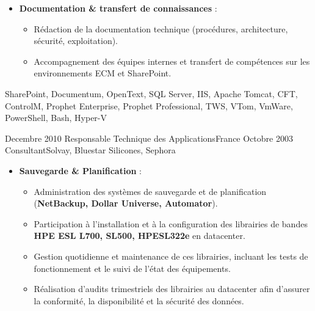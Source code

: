 \begin{experiences}
{\begin{itemize}[left=0pt,label={},itemsep=0.4em]
          \item \textbf{Documentation \& transfert de connaissances} :
            \begin{itemize}[itemsep=0.15em,topsep=0.1em,parsep=0pt]
              \small
              \item Rédaction de la documentation technique (procédures, architecture, sécurité, exploitation).
              \item Accompagnement des équipes internes et transfert de compétences sur les environnements ECM et SharePoint.
            \end{itemize}

        \end{itemize}
    }
    {SharePoint, Documentum, OpenText, SQL Server, IIS, Apache Tomcat, CFT, ControlM, Prophet Enterprise, Prophet Professional, TWS, VTom, VmWare, PowerShell, Bash, Hyper-V}
\emptySeparator


\consultantexperience
    {Decembre 2010} {Responsable Technique des Applications}{}{France}
    {Octobre 2003}    {Consultant}{Solvay, Bluestar Silicones, Sephora} {
        \begin{itemize}[left=0pt,label={},itemsep=0.5em]

          \item \textbf{Sauvegarde \& Planification} :
            \begin{itemize}[itemsep=0.2em,topsep=0.2em,parsep=0pt]
              \small
              \item Administration des systèmes de sauvegarde et de planification (\textbf{NetBackup, Dollar Universe, Automator}).
              \item Participation à l'installation et à la configuration des librairies de bandes \textbf{HPE ESL L700, SL500, HPESL322e} en datacenter.
              \item Gestion quotidienne et maintenance de ces librairies, incluant les tests de fonctionnement et le suivi de l'état des équipements.
              \item Réalisation d'audits trimestriels des librairies au datacenter afin d'assurer la conformité, la disponibilité et la sécurité des données.
            \end{itemize}


          \vspace{0.3em}


\end{itemize}}
\end{experiences}
